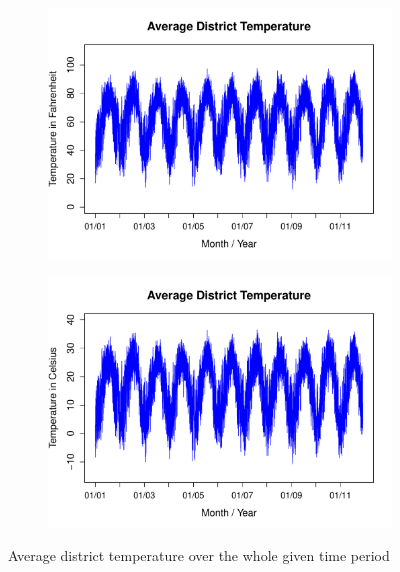 \documentclass[conference]{IEEEtran}
\begin{document}
\begin{figure}[!ht]
\centering
\begin{subfigure}[b]{.8\linewidth}
\includegraphics[width=\linewidth]{gfx/avg-district-temp-fahrenheit.pdf}
\label{subfig:avg-temp-fahrenheit}
\end{subfigure}
\begin{subfigure}[b]{.8\linewidth}
\includegraphics[width=\linewidth]{gfx/avg-district-temp-celsius.pdf}
\label{subfig:avg-temp-celsius}
\end{subfigure}
\caption{Average district temperature over the whole given time period}
\label{fig:temp-lags}
\end{figure}
\end{document}
